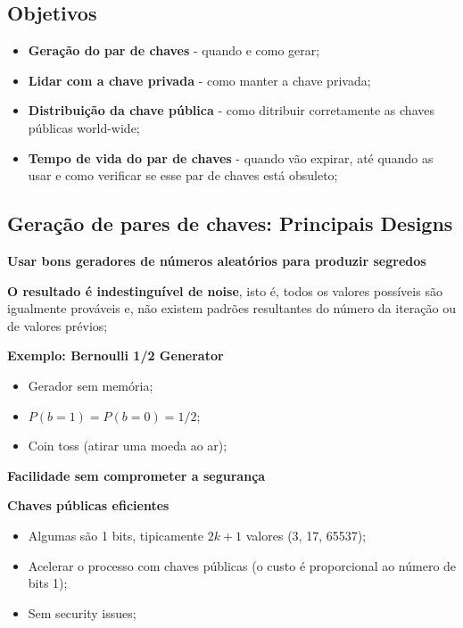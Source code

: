\documentclass{article}
\begin{document}
\subsection{Objetivos}

\begin{flushleft}
  \begin{itemize}
    \item \textbf{Geração do par de chaves} - quando e como gerar;
    \item \textbf{Lidar com a chave privada} - como manter a chave privada;
    \item \textbf{Distribuição da chave pública} - como ditribuir corretamente as chaves públicas world-wide;
    \item \textbf{Tempo de vida do par de chaves} - quando vão expirar, até quando as usar e como verificar
    se esse par de chaves está obsuleto;
  \end{itemize}
\end{flushleft}

\pagebreak

\subsection{Geração de pares de chaves: Principais Designs}

\textbf{Usar bons geradores de números aleatórios para produzir segredos}

\begin{flushleft}
  \textbf{O resultado é indestinguível de noise}, isto é,
  todos os valores possíveis são igualmente prováveis e,
  não existem padrões resultantes do número da iteração ou de valores prévios;

  \vspace{2mm}

  \textbf{Exemplo: Bernoulli 1/2 Generator}
  \begin{itemize}
    \item Gerador sem memória;
    \item $P(b=1) = P(b=0) = 1/2$;
    \item Coin toss (atirar uma moeda ao ar);
  \end{itemize}
\end{flushleft}

\textbf{Facilidade sem comprometer a segurança}

\begin{flushleft}
  \textbf{Chaves públicas eficientes}
  \begin{itemize}
    \item Algumas são 1 bits, tipicamente $2k + 1$ valores (3, 17, 65537);
    \item Acelerar o processo com chaves públicas (o custo é proporcional ao número de bits 1);
    \item Sem security issues;
  \end{itemize}
\end{flushleft}
\end{document}
